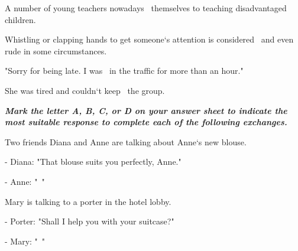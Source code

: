 \documentclass[11pt]{article}
\def\ktrang{\makebox[1.5cm]{\hrulefill}\ }
\begin{document}
\begin{multiplechoice}[rearrange=yes, keycolumns=2]
\begin{question} %
A number of young teachers nowadays \ktrang  themselves to teaching disadvantaged children.
\datcot
\bonpa
{}
{}
{}
{}
\end{question}

\begin{question} %
Whistling or clapping hands to get someone‘s attention is considered \ktrang  and even rude in
some circumstances.
\datcot
\bonpa
{}
{}
{}
{}
\end{question}

\begin{question} %
 "Sorry for being late. I was \ktrang  in the traffic for more than an hour."
\datcot
\bonpa
{}
{}
{}
{}
\end{question}

\begin{question} %
She was tired and couldn‘t keep \ktrang  the group.
\datcot
\bonpa
{}
{}
{}
{}
\end{question}
\end{multiplechoice}

\begin{multiplechoice}[rearrange=yes, keycolumns=2]%
\examvspace*{0.7cm}
\textit{\textbf{Mark the letter A, B, C, or D on your answer sheet to indicate the most suitable response to
complete each of the following exchanges.}}
\begin{question} %
Two friends Diana and Anne are talking about Anne‘s new blouse.

- Diana: "That blouse suits you perfectly, Anne."

- Anne: "\ktrang"
\datcot
\bonpa
{}
{}
{}
{}
\end{question}

\begin{question} %
Mary is talking to a porter in the hotel lobby.

- Porter: "Shall I help you with your suitcase?"

- Mary: "\ktrang"
\datcot
\bonpa
{}
{}
{}
{}
\end{question}
\end{multiplechoice}
\end{document}
